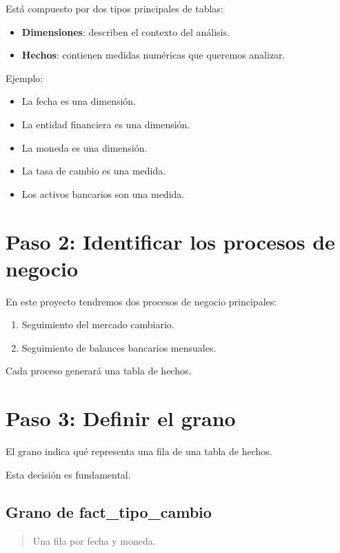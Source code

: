 Está compuesto por dos tipos principales de tablas:

\begin{itemize}
\item \textbf{Dimensiones}: describen el contexto del análisis.
\item \textbf{Hechos}: contienen medidas numéricas que queremos analizar.
\end{itemize}

Ejemplo:

\begin{itemize}
\item La fecha es una dimensión.
\item La entidad financiera es una dimensión.
\item La moneda es una dimensión.
\item La tasa de cambio es una medida.
\item Los activos bancarios son una medida.
\end{itemize}

\section{Paso 2: Identificar los procesos de negocio}

En este proyecto tendremos dos procesos de negocio principales:

\begin{enumerate}
\item Seguimiento del mercado cambiario.
\item Seguimiento de balances bancarios mensuales.
\end{enumerate}

Cada proceso generará una tabla de hechos.

\section{Paso 3: Definir el grano}

El grano indica qué representa una fila de una tabla de hechos.

Esta decisión es fundamental.

\subsection{Grano de fact\_tipo\_cambio}

\begin{quote}
Una fila por fecha y moneda.
\end{quote}

